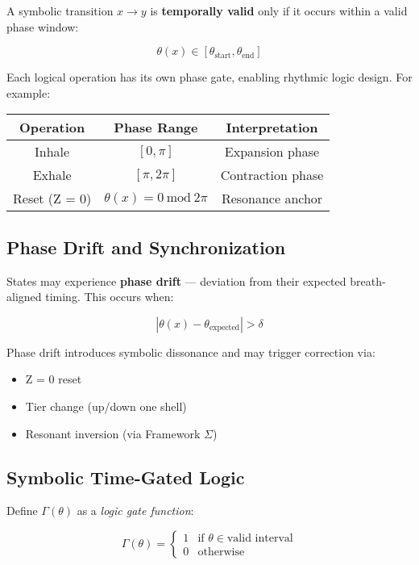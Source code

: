A symbolic transition $x \rightarrow y$ is \textbf{temporally valid} only if it occurs within a valid phase window:

\[
\theta(x) \in [\theta_{\text{start}}, \theta_{\text{end}}]
\]

Each logical operation has its own phase gate, enabling rhythmic logic design. For example:

\begin{center}
\begin{tabular}{|c|c|c|}
\hline
\textbf{Operation} & \textbf{Phase Range} & \textbf{Interpretation} \\
\hline
Inhale & $[0, \pi]$ & Expansion phase \\
Exhale & $[\pi, 2\pi]$ & Contraction phase \\
Reset (Z = 0) & $\theta(x) = 0\ \text{mod}\ 2\pi$ & Resonance anchor \\
\hline
\end{tabular}
\end{center}

\subsection*{Phase Drift and Synchronization}

States may experience \textbf{phase drift} — deviation from their expected breath-aligned timing. This occurs when:

\[
|\theta(x) - \theta_{\text{expected}}| > \delta
\]

Phase drift introduces symbolic dissonance and may trigger correction via:
\begin{itemize}
  \item Z = 0 reset
  \item Tier change (up/down one shell)
  \item Resonant inversion (via Framework $\Sigma$)
\end{itemize}

\subsection*{Symbolic Time-Gated Logic}

Define $\Gamma(\theta)$ as a \emph{logic gate function}:

\[
\Gamma(\theta) =
\begin{cases}
1 & \text{if } \theta \in \text{valid interval} \\
0 & \text{otherwise}
\end{cases}
\]


